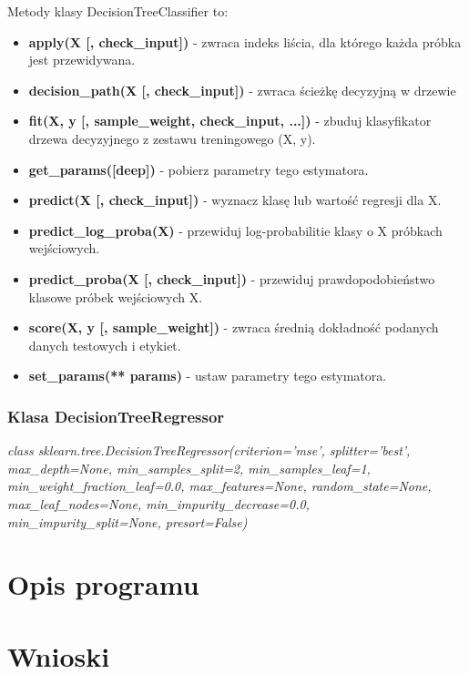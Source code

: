 \documentclass[10pt,a4paper]{article}
\begin{document}
Metody klasy DecisionTreeClassifier to:
\begin{itemize}
	\item \textbf{apply(X [, check\_input])} - zwraca indeks liścia, dla którego każda próbka jest przewidywana.
	\item \textbf{decision\_path(X [, check\_input])} - zwraca ścieżkę decyzyjną w drzewie
	\item \textbf{fit(X, y [, sample\_weight, check\_input, ...])} - zbuduj klasyfikator drzewa decyzyjnego z zestawu treningowego (X, y).
	\item \textbf{get\_params([deep])} - pobierz parametry tego estymatora.
	\item \textbf{predict(X [, check\_input])} - wyznacz klasę lub wartość regresji dla X.
	\item \textbf{predict\_log\_proba(X)} - przewiduj log-probabilitie klasy o X próbkach wejściowych.
	\item \textbf{predict\_proba(X [, check\_input])} - przewiduj prawdopodobieństwo klasowe próbek wejściowych X.
	\item \textbf{score(X, y [, sample\_weight])} - zwraca średnią dokładność podanych danych testowych i etykiet.
	\item \textbf{set\_params(** params)} - ustaw parametry tego estymatora.
\end{itemize}

\subsubsection{Klasa DecisionTreeRegressor}
\label{subsub:DecisionTreeRegressor}
\begin{flushleft}
	\textit{class sklearn.tree.DecisionTreeRegressor(criterion=’mse’, splitter=’best’, max\_depth=None, min\_samples\_split=2, min\_samples\_leaf=1, min\_weight\_fraction\_leaf=0.0, max\_features=None, random\_state=None, max\_leaf\_nodes=None, min\_impurity\_decrease=0.0, min\_impurity\_split=None, presort=False)}
\end{flushleft}\par
\vskip 0.2in


\section{Opis programu}

\section{Wnioski}
\end{document}

